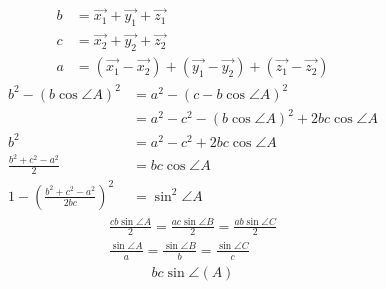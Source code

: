 \documentclass{article}
\begin{document}
  \begin{align*}
    b &= \vec{x_{1}} + \vec{y_{1}} + \vec{z_{1}}\\
    c &= \vec{x_{2}} + \vec{y_{2}} + \vec{z_{2}}\\
    a &= ( \vec{x_{1}} - \vec{x_{2}} ) + ( \vec{y_{1}} - \vec{y_{2}} ) + ( \vec{z_{1}} - \vec{z_{2}} )
  \end{align*}
  \begin{align*}
    b^{2} - ( b\cos{\angle{A}} )^{2} &= a^{2} - ( c-b\cos{\angle{A}} )^{2}\\
    &= a^{2} - c^{2} - ( b\cos{\angle{A}} )^{2} + 2bc\cos{\angle{A}}\\
    b^{2} &= a^{2} - c^{2} + 2bc\cos{\angle{A}}\\
    \frac{b^{2} + c^{2} - a^{2}}{2} &= bc\cos{\angle{A}}\\
    1 - (\frac{b^{2} + c^{2} - a^{2}}{2bc} )^{2} &= \sin^{2}{\angle{A}}
  \end{align*}
  \begin{align*}
    \frac{cb\sin{\angle{A}}}{2} = \frac{ac\sin{\angle{B}}}{2} = \frac{ab\sin{\angle{C}}}{2}\\
    \frac{\sin{\angle{A}}}{a} = \frac{\sin{\angle{B}}}{b} = \frac{\sin{\angle{C}}}{c}
  \end{align*}
  \begin{align*}
    bc\sin{\angle(A)}
  \end{align*}
\end{document}
